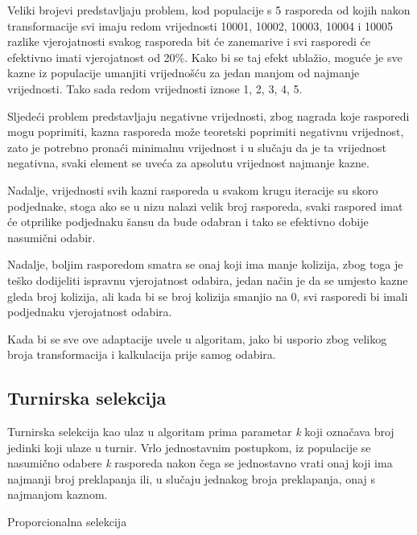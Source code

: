 \documentclass[times, utf8, zavrsni]{fer}
\begin{document}
Veliki brojevi predstavljaju problem, kod populacije s 5 rasporeda od kojih nakon transformacije svi imaju redom vrijednosti 10001, 10002, 10003, 10004 i 10005 razlike vjerojatnosti svakog rasporeda bit će zanemarive i svi rasporedi će efektivno imati vjerojatnost od 20\%. Kako bi se taj efekt ublažio, moguće je sve kazne iz populacije umanjiti vrijednošću za jedan manjom od najmanje vrijednosti. Tako sada redom vrijednosti iznose 1, 2, 3, 4, 5.

Sljedeći problem predstavljaju negativne vrijednosti, zbog nagrada koje rasporedi mogu poprimiti, kazna rasporeda može teoretski poprimiti negativnu vrijednost, zato je potrebno pronaći minimalnu vrijednost i u slučaju da je ta vrijednost negativna, svaki element se uveća za apsolutu vrijednost najmanje kazne.

Nadalje, vrijednosti svih kazni rasporeda u svakom krugu iteracije su skoro podjednake, stoga ako se u nizu nalazi velik broj rasporeda, svaki raspored imat će otprilike podjednaku šansu da bude odabran i tako se efektivno dobije nasumični odabir.

Nadalje, boljim rasporedom smatra se onaj koji ima manje kolizija, zbog toga je teško dodijeliti ispravnu vjerojatnost odabira, jedan način je da se umjesto kazne gleda broj kolizija, ali kada bi se broj kolizija smanjio na 0, svi rasporedi bi imali podjednaku vjerojatnost odabira.

Kada bi se sve ove adaptacije uvele u algoritam, jako bi usporio zbog velikog broja transformacija i kalkulacija prije samog odabira.

\subsection{Turnirska selekcija}

Turnirska selekcija kao ulaz u algoritam prima parametar \emph{k} koji označava broj jedinki koji ulaze u turnir. Vrlo jednostavnim postupkom, iz populacije se nasumično odabere \emph{k} rasporeda nakon čega se jednostavno vrati onaj koji ima najmanji broj preklapanja ili, u slučaju jednakog broja preklapanja, onaj s najmanjom kaznom.

\begin{algorithm}
\caption{Proporcionalna selekcija}
\label{algo:proporcionalno}
\begin{algorithmic}
\ENDIF
\ENDWHILE
{}
\end{algorithmic}
\end{algorithm}
\end{document}
